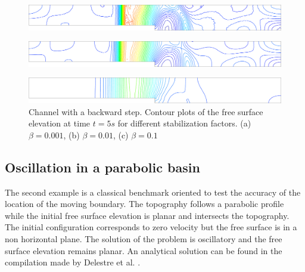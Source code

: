 \documentclass[a4paper,12pt]{elsarticle}
\begin{document}
\begin{figure}[H]
    \begin{subfigure}{.05\textwidth}
        \caption{}
    \end{subfigure}
    \begin{minipage}[c]{.94\textwidth}
        \includegraphics[width=\textwidth]{img/step/stab_0.001_time_5.pdf}
    \end{minipage}
    \par\medskip
    \begin{subfigure}{.05\textwidth}
        \caption{}
    \end{subfigure}
    \begin{minipage}[c]{.94\textwidth}
        \includegraphics[width=\textwidth]{img/step/stab_0.01_time_5.pdf}
    \end{minipage}
    \par\medskip
    \begin{subfigure}{.05\textwidth}
        \caption{}
    \end{subfigure}
    \begin{minipage}[c]{.94\textwidth}
        \includegraphics[width=\textwidth]{img/step/stab_0.1_time_5.pdf}
    \end{minipage}
\caption{Channel with a backward step. Contour plots of the free surface elevation at time $t=5s$ for different stabilization factors. (a) $\beta=0.001$, (b) $\beta=0.01$, (c) $\beta=0.1$}
\label{stab_parameters_time2}
\end{figure}



\subsection{Oscillation in a parabolic basin}

The second example is a classical benchmark oriented to test the accuracy of the location of the moving boundary. The topography follows a parabolic profile while the initial free surface elevation is planar and intersects the topography. The initial configuration corresponds to zero velocity but the free surface is in a non horizontal plane. The solution of the problem is oscillatory and the free surface elevation remains planar. An analytical solution can be found in the compilation made by Delestre et al. \cite{delestre2013}.
\end{document}
